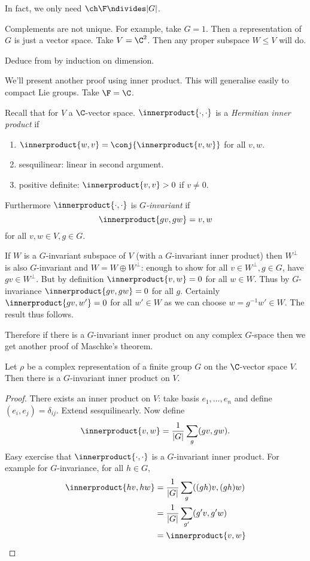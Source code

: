 \documentclass[a4paper]{article}
\newcommand*{\ip}{\innerproduct} %
\begin{document}
In fact, we only need \(\ch \F \ndivides |G|\).

\begin{remark}
  Complements are not unique. For example, take \(G = 1\). Then a representation of \(G\) is just a vector space. Take \(V = \C^2\). Then any proper subspace \(W \leq V\) will do.
\end{remark}

\begin{ex}
  Deduce  from  by induction on dimension.
\end{ex}

We'll present another proof using inner product. This will generalise easily to compact Lie groups. Take \(\F = \C\).

Recall that for \(V\) a \(\C\)-vector space. \(\ip{\cdot, \cdot}\) is a \emph{Hermitian inner product} if
\begin{enumerate}
\item \(\ip{w, v} = \conj{\ip{v, w}}\) for all \(v, w\).
\item sesquilinear: linear in second argument.
\item positive definite: \(\ip{v, v} > 0\) if \(v \neq 0\).
\end{enumerate}
Furthermore \(\ip{\cdot, \cdot}\) is \emph{\(G\)-invariant} if
\[
  \ip{gv, gw} = {v, w}
\]
for all \(v, w \in V, g \in G\).

If \(W\) is a \(G\)-invariant subspace of \(V\) (with a \(G\)-invariant inner product) then \(W^\perp\) is also \(G\)-invariant and \(W = W \oplus W^\perp\): enough to show for all \(v \in W^\perp, g \in G\), have \(gv \in W^\perp\). But by definition \(\ip{v, w} = 0\) for all \(w \in W\). Thus by \(G\)-invariance \(\ip{gv, gw} = 0\) for all \(g\). Certainly \(\ip{gv, w'} = 0\) for all \(w' \in W\) as we can choose \(w = g^{-1}w' \in W\). The result thus follows.

Therefore if there is a \(G\)-invariant inner product on any complex \(G\)-space then we get another proof of Maschke's theorem.

\begin{lemma}
  Let \(\rho\) be a complex representation of a finite group \(G\) on the \(\C\)-vector space \(V\). Then there is a \(G\)-invariant inner product on \(V\).
\end{lemma}

\begin{proof}
  There exists an inner product on \(V\): take basis \(e_1, \dots, e_n\) and define \((e_i, e_j) = \delta_{ij}\). Extend sesquilinearly. Now define
  \[
    \ip{v, w} = \frac{1}{|G|} \sum_g (gv, gw).
  \]
  Easy exercise that \(\ip{\cdot, \cdot}\) is a \(G\)-invariant inner product. For example for \(G\)-invariance, for all \(h \in G\),
  \begin{align*}
    \ip{hv, hw}
    &= \frac{1}{|G|} \sum_g ((gh)v, (gh)w) \\
    &= \frac{1}{|G|} \sum_{g'} (g'v, g'w) \\
    &= \ip{v, w}
  \end{align*}
\end{proof}
\end{document}
